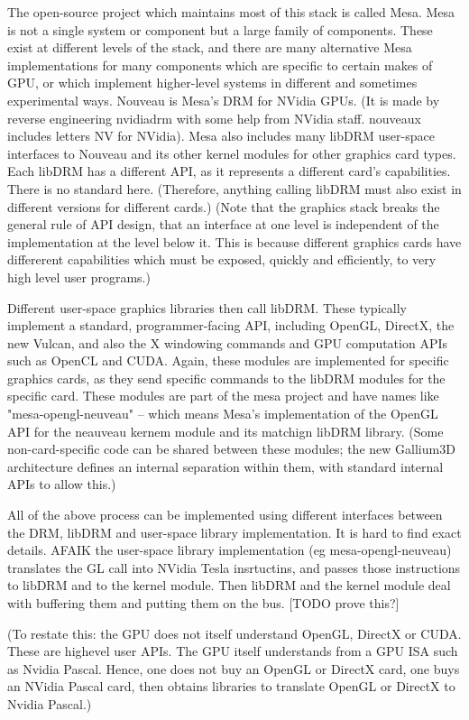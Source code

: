 \documentclass[oneside,english]{scrbook}
\begin{document}
The open-source project which maintains most of this stack is called Mesa. Mesa is not a single system or component but a large family of components. These exist at different levels of the stack, and there are many alternative Mesa implementations for many components which are specific to certain makes of GPU, or which implement higher-level systems in different and sometimes experimental ways.   Nouveau is Mesa's DRM for NVidia GPUs. (It is made by reverse engineering nvidiadrm with some help from NVidia staff. nouveaux includes letters NV for NVidia).  Mesa also includes many libDRM user-space interfaces to Nouveau and its other kernel modules for other graphics card types.   Each libDRM has a different API, as it represents a different card's capabilities. There is no standard here. (Therefore, anything calling libDRM must also exist in different versions for different cards.) (Note that the graphics stack breaks the general rule of API design, that an interface at one level is independent of the implementation at the level below it.  This is because different graphics cards have differerent capabilities which must be exposed, quickly and efficiently, to very high level user programs.)

Different user-space graphics libraries then call libDRM.   These typically implement a standard, programmer-facing API, including OpenGL, DirectX, the new Vulcan, and also the X windowing commands and GPU computation APIs such as OpenCL and CUDA.  Again, these modules are implemented for specific graphics cards, as they send specific commands to the libDRM modules for the specific card.  These modules are part of the mesa project and have names like "mesa-opengl-neuveau" -- which means Mesa's implementation of the OpenGL API for the neauveau kernem module and its matchign libDRM library.   (Some non-card-specific code can be shared between these modules; the new Gallium3D architecture defines an internal separation within them, with standard internal APIs to allow this.)

All of the above process can be implemented using different interfaces between the DRM, libDRM and user-space library implementation.   It is hard to find exact details. AFAIK the user-space library implementation (eg mesa-opengl-neuveau) translates the GL call into NVidia Tesla insrtuctins, and passes those instructions to libDRM and to the kernel module. Then libDRM and the kernel module deal with buffering them and putting them on the bus. [TODO prove this?]

(To restate this: the GPU does not itself understand OpenGL, DirectX or CUDA.  These are highevel user APIs. The GPU itself understands from a GPU ISA such as Nvidia Pascal. Hence, one does not buy an OpenGL or DirectX card, one buys an NVidia Pascal card, then obtains libraries to translate OpenGL or DirectX to Nvidia Pascal.)
\end{document}
